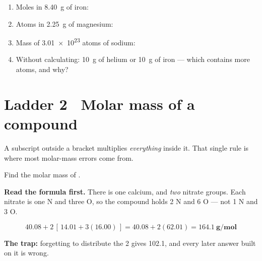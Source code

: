 \documentclass{apchem-worksheet}
\begin{document}
\begin{yourturn}
\begin{enumerate}[leftmargin=*,itemsep=0.5em]
  \item Moles in \SI{8.40}{\gram} of iron: \workspace[1.4cm]
  \item Atoms in \SI{2.25}{\gram} of magnesium: \workspace[1.6cm]
  \item Mass of \SI{3.01e23}{} atoms of sodium: \workspace[1.6cm]
  \item Without calculating: \SI{10}{\gram} of helium or \SI{10}{\gram} of
        iron --- which contains more atoms, and why? \workspace[1.6cm]
\end{enumerate}
\end{yourturn}

\section*{\sffamily Ladder 2 \textbullet\ Molar mass of a compound}

A subscript outside a bracket multiplies \emph{everything} inside it.
That single rule is where most molar-mass errors come from.

\begin{workedexample}
Find the molar mass of .

\textbf{Read the formula first.} There is one calcium, and \emph{two}
nitrate groups. Each nitrate is one N and three O, so the compound holds
2 N and 6 O --- not 1 N and 3 O.

\[ 40.08 + 2\,[\,14.01 + 3(16.00)\,] = 40.08 + 2(62.01)
   = \mathbf{164.1~g/mol} \]

\textbf{The trap:} forgetting to distribute the 2 gives \num{102.1}, and
every later answer built on it is wrong.
\end{workedexample}
\end{document}
